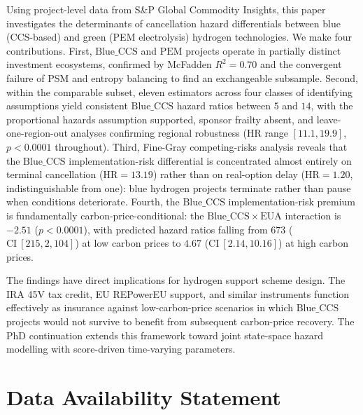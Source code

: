 \documentclass[11pt,a4paper]{article}
\newcommand{\HR}{\mathrm{HR}}
\newcommand{\BlueCCS}{\mathrm{Blue\_CCS}}
\newcommand{\PEM}{\mathrm{PEM}}
\newcommand{\EUA}{\mathrm{EUA}}
\begin{document}
Using project-level data from S\&P Global Commodity Insights, this paper investigates the determinants of cancellation hazard differentials between blue (CCS-based) and green (PEM electrolysis) hydrogen technologies. We make four contributions. First, $\BlueCCS$ and $\PEM$ projects operate in partially distinct investment ecosystems, confirmed by McFadden $R^2 = 0.70$ and the convergent failure of PSM and entropy balancing to find an exchangeable subsample. Second, within the comparable subset, eleven estimators across four classes of identifying assumptions yield consistent $\BlueCCS$ hazard ratios between $5$ and $14$, with the proportional hazards assumption supported, sponsor frailty absent, and leave-one-region-out analyses confirming regional robustness ($\HR$ range $[11.1, 19.9]$, $p < 0.0001$ throughout). Third, Fine-Gray competing-risks analysis reveals that the $\BlueCCS$ implementation-risk differential is concentrated almost entirely on terminal cancellation ($\HR = 13.19$) rather than on real-option delay ($\HR = 1.20$, indistinguishable from one): blue hydrogen projects terminate rather than pause when conditions deteriorate. Fourth, the $\BlueCCS$ implementation-risk premium is fundamentally carbon-price-conditional: the $\BlueCCS \times \EUA$ interaction is $-2.51$ ($p < 0.0001$), with predicted hazard ratios falling from $673$ ($\mathrm{CI}\ [215, 2{,}104]$) at low carbon prices to $4.67$ ($\mathrm{CI}\ [2.14, 10.16]$) at high carbon prices.

The findings have direct implications for hydrogen support scheme design. The IRA 45V tax credit, EU REPowerEU support, and similar instruments function effectively as insurance against low-carbon-price scenarios in which $\BlueCCS$ projects would not survive to benefit from subsequent carbon-price recovery. The PhD continuation extends this framework toward joint state-space hazard modelling with score-driven time-varying parameters.

\section*{Data Availability Statement}
\end{document}
